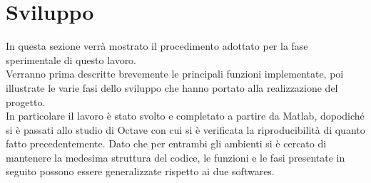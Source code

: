 \section{Sviluppo}\label{sviluppo}
In questa sezione verrà mostrato il procedimento adottato per la fase sperimentale di questo lavoro. \\
Verranno prima descritte brevemente le principali funzioni implementate, poi illustrate le varie fasi dello sviluppo che hanno portato alla realizzazione del progetto. \\
In particolare il lavoro è stato svolto e completato a partire da Matlab, dopodiché si è passati allo studio di Octave con cui si è verificata la riproducibilità di quanto fatto precedentemente.
Dato che per entrambi gli ambienti si è cercato di mantenere la medesima struttura del codice, le funzioni e le fasi presentate in seguito possono essere generalizzate rispetto ai due softwares.


